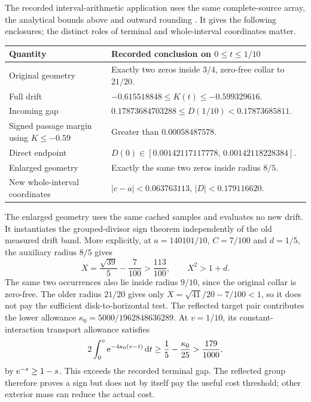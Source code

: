 The recorded interval-arithmetic application uses the same complete-source
array, the analytical bounds above and outward rounding
\cite{gtcertificate,gtgeometry}. It gives the following enclosures;
the distinct roles of terminal and whole-interval coordinates matter.
\begin{center}
\small
\begin{tabular}{@{}p{}p{}@{}}
\toprule
Quantity & Recorded conclusion on \(0\le t\le1/10\)\\
\midrule
Original geometry & Exactly two zeros inside \(3/4\), zero-free collar to \(21/20\).\\
Full drift & \(-0.615518848\le K(t)\le-0.599329616\).\\
Incoming gap & \(0.17873684703288\le D(1/10)<0.17873685811\).\\
Signed passage margin using \(K\le-0.59\) & Greater than \(0.00058487578\).\\
Direct endpoint & \(D(0)\in[0.00142117117778,\,0.00142118228384]\).\\
Enlarged geometry & Exactly the same two zeros inside radius \(8/5\).\\
New whole-interval coordinates & \(|c-a|<0.063763113\), \(|D|<0.179116620\).\\
\bottomrule
\end{tabular}
\end{center}
The enlarged geometry uses the same cached samples and evaluates no
new drift. It instantiates the grouped-divisor sign theorem independently
of the old measured drift band. More explicitly, at
\(a=140101/10\), \(C=7/100\) and \(d=1/5\), the auxiliary radius
\(8/5\) gives
\[
 X=\frac{\sqrt{39}}5-\frac7{100}>\frac{113}{100},
 \qquad X^2>1+d.
\]
The same two occurrences also lie inside radius \(9/10\), since the
original collar is zero-free. The older radius \(21/20\) gives only
\(X=\sqrt{41}/20-7/100<1\), so it does not pay the sufficient
disk-to-horizontal test. The reflected target pair contributes the
lower allowance \(\kappa_0=5000/1962848636289\). At \(v=1/10\), its
constant-interaction transport allowance satisfies
\[
 2\int_0^v \mathrm e^{-4\kappa_0(v-t)}\,\mathrm d t
 \ge \frac15-\frac{\kappa_0}{25}>\frac{179}{1000},
\]
by \(\mathrm e^{-s}\ge1-s\). This exceeds the recorded terminal gap.
The reflected group therefore proves a sign but does not by itself
pay the useful cost threshold; other exterior mass can reduce the
actual cost.

